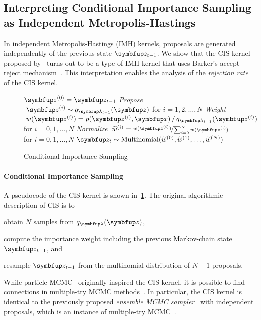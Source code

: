 \subsection{Interpreting Conditional Importance Sampling as Independent Metropolis-Hastings}\label{section:cis_imh}
In independent Metropolis-Hastings (IMH) kernels, proposals are generated independently of the previous state \(\vz_{t-1}\).
We show that the CIS kernel proposed by~\citet{NEURIPS2020_b2070693} turns out to be a type of IMH kernel that uses Barker's accept-reject mechanism~\citep{barker_monte_1965}.
This interpretation enables the analysis of the \textit{rejection rate} of the CIS kernel.

\begin{figure}[H]
  \vspace{-0.1in}
  \small
  \begin{algorithm2e}[H]
    \DontPrintSemicolon
    \SetAlgoLined
    \(\vz^{(0)} = \vz_{t-1}\) \;
    \textit{Propose} \(\;\vz^{(i)} \sim q_{\vlambda_{t-1}}(\vz)\) for \(i = 1, 2,\ldots, N\) \;
    \textit{Weight} \(\;w(\vz^{(i)}) = p(\vz^{(i)},\vx) \,/\, q_{\vlambda_{t-1}}(\vz^{(i)}) \) for \(i = 0, 1,\ldots, N\)\;
    \textit{Normalize} \(\;\widetilde{w}^{(i)} = \nicefrac{w(\vz^{(i)})}{ \sum^{N}_{i=0} w(\vz^{(i)}) }\) for \(i = 0, 1,\ldots, N\)\;
    \(\vz_{t} \sim \mathrm{Multinomial}(\widetilde{w}^{(0)}, \widetilde{w}^{(1)}, \ldots, \widetilde{w}^{(N)}) \)\;
    \caption{Conditional Importance Sampling}\label{alg:cis}
  \end{algorithm2e}
  \vspace{-0.2in}
\end{figure}
%
\vspace{-0.1in}
\paragraph{Conditional Importance Sampling}
A pseudocode of the CIS kernel is shown in~\cref{alg:cis}.
The original algorithmic description of CIS is to
\begin{enumerate*}[label=(\roman*)]
  \item obtain \(N\) samples from \(q_{\vlambda}(\vz)\),
  \item compute the importance weight including the previous Markov-chain state \(\vz_{t-1}\), and 
  \item resample \(\vz_{t-1}\) from the multinomial distribution of \(N+1\) proposals.
\end{enumerate*}
%
While particle MCMC~\citep{andrieu_particle_2010} originally inspired the CIS kernel, it is possible to find connections in multiple-try MCMC methods~\citep{martino_review_2018}.
In particular, the CIS kernel is identical to the previously proposed \textit{ensemble MCMC sampler}~\citep{austad_parallel_2007, neal_mcmc_2011a} with independent proposals, which is an instance of multiple-try MCMC~\citep[Table 12]{martino_review_2018}.

